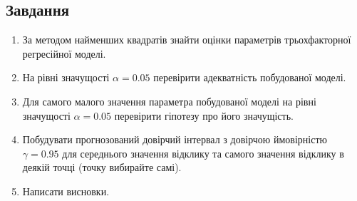 \documentclass{article}
\begin{document}
    \subsection{Завдання}
      \begin{enumerate}
        \item За методом найменших квадратів знайти оцінки параметрів трьохфакторної регресійної моделі.
        \item На рівні значущості $\alpha = 0.05$ перевірити адекватність побудованої моделі.
        \item Для самого малого значення параметра побудованої моделі на рівні значущості $\alpha = 0.05$ перевірити гіпотезу про його значущість.
        \item Побудувати прогнозований довірчий інтервал з довірчою ймовірністю $\gamma = 0.95$ для середнього значення відклику та самого  значення відклику в деякій точці (точку вибирайте самі).
        \item Написати висновки.
      \end{enumerate}
\end{document}
